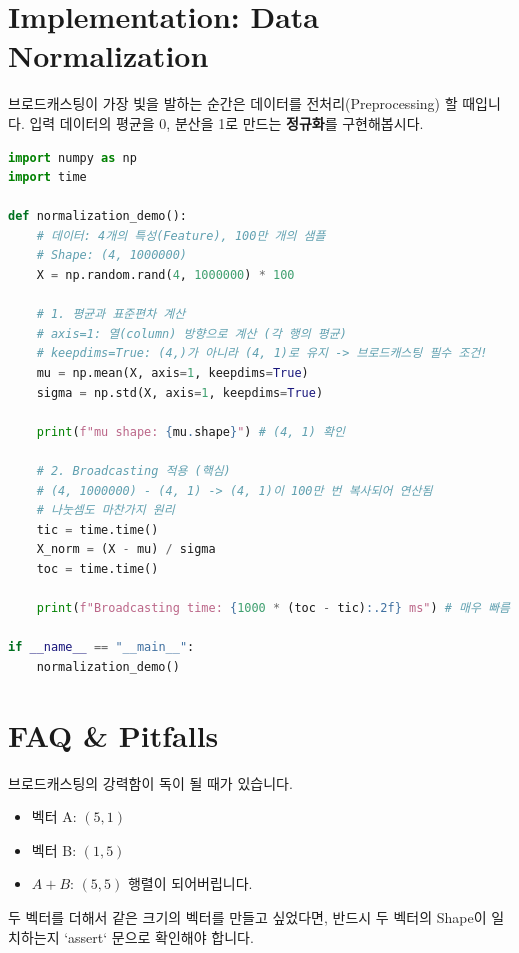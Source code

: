 \documentclass[11pt,a4paper]{book}
\theoremstyle{definition}
\begin{document}
\section{Implementation: Data Normalization}

브로드캐스팅이 가장 빛을 발하는 순간은 데이터를 전처리(Preprocessing) 할 때입니다. 
입력 데이터의 평균을 0, 분산을 1로 만드는 \textbf{정규화}를 구현해봅시다.

\begin{lstlisting}[language=Python, caption=Broadcasting Implementation, breaklines=true]
import numpy as np
import time

def normalization_demo():
    # 데이터: 4개의 특성(Feature), 100만 개의 샘플
    # Shape: (4, 1000000)
    X = np.random.rand(4, 1000000) * 100
    
    # 1. 평균과 표준편차 계산
    # axis=1: 열(column) 방향으로 계산 (각 행의 평균)
    # keepdims=True: (4,)가 아니라 (4, 1)로 유지 -> 브로드캐스팅 필수 조건!
    mu = np.mean(X, axis=1, keepdims=True)
    sigma = np.std(X, axis=1, keepdims=True)
    
    print(f"mu shape: {mu.shape}") # (4, 1) 확인
    
    # 2. Broadcasting 적용 (핵심)
    # (4, 1000000) - (4, 1) -> (4, 1)이 100만 번 복사되어 연산됨
    # 나눗셈도 마찬가지 원리
    tic = time.time()
    X_norm = (X - mu) / sigma
    toc = time.time()
    
    print(f"Broadcasting time: {1000 * (toc - tic):.2f} ms") # 매우 빠름

if __name__ == "__main__":
    normalization_demo()
\end{lstlisting}

\section{FAQ \& Pitfalls}

\begin{warningbox}[title={주의: (m, 1) + (1, m) = (m, m)}]
브로드캐스팅의 강력함이 독이 될 때가 있습니다.
\begin{itemize}
    \item 벡터 A: $(5, 1)$
    \item 벡터 B: $(1, 5)$
    \item $A + B$: $(5, 5)$ 행렬이 되어버립니다.
\end{itemize}
두 벡터를 더해서 같은 크기의 벡터를 만들고 싶었다면, 반드시 두 벡터의 Shape이 일치하는지 `assert` 문으로 확인해야 합니다.
\end{warningbox}
\end{document}
